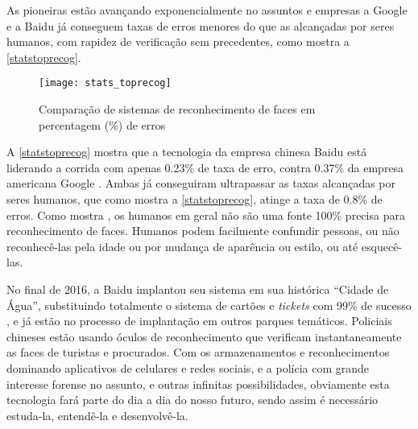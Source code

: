 As pioneiras estão avançando exponencialmente no assuntos e empresas a Google e a Baidu já conseguem taxas de erros menores do que as alcançadas por seres humanos, com rapidez de verificação sem precedentes, como mostra a \autoref{statstoprecog}.

\vspace*{10cm}
\begin{figure}[h]
	\centering
	\texttt{[image: stats\_toprecog]}
	\caption{Comparação de sistemas de reconhecimento de faces em percentagem (\%) de erros}
	\label{statstoprecog}
\end{figure}


A \autoref{statstoprecog} mostra que a tecnologia da empresa chinesa Baidu está liderando a corrida com apenas 0.23\% de taxa de erro, contra 0.37\% da empresa americana Google \cite{stats_economy_compass_2017}. Ambas já conseguiram ultrapassar as taxas alcançadas por seres humanos, que como mostra a \autoref{statstoprecog}, atinge a taxa de 0.8\% de erros. Como mostra \cite{stats_economy_compass_2017}, os humanos em geral não são uma fonte 100\% precisa para reconhecimento de faces. Humanos podem facilmente confundir pessoas, ou não reconhecê-las pela idade ou por mudança de aparência ou estilo, ou até esquecê-las.

No final de 2016, a Baidu implantou seu sistema em sua histórica “Cidade de Água”, substituindo totalmente o sistema de cartões e \textit{tickets} com 99\% de sucesso \cite{baidiu_theverge}, e já estão no processo de implantação em outros parques temáticos. Policiais chineses estão usando óculos de reconhecimento que verificam instantaneamente as faces de turistas e procurados. Com os armazenamentos e reconhecimentos dominando aplicativos de celulares e redes sociais, e a polícia com grande interesse forense no assunto, e outras infinitas possibilidades, obviamente esta tecnologia fará parte do dia a dia do nosso futuro, sendo assim é necessário estuda-la, entendê-la e desenvolvê-la.










